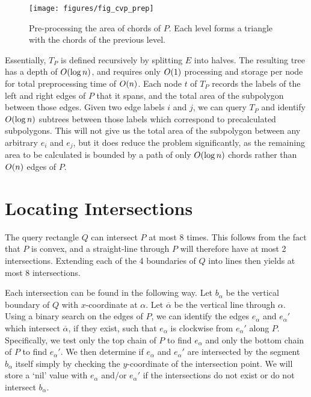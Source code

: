 \begin{figure}[t]
\begin{center}
  \texttt{[image: figures/fig\_cvp\_prep]}
  \caption[Pre-processing the area of chords of $P$.]{Pre-processing the area of chords of $P$.  Each level forms a triangle with the chords of the previous level.}
  \label{fig:convexp:preprocessing}
\end{center}
\end{figure}

Essentially, $T_P$ is defined recursively by splitting $E$ into halves. The resulting tree has a depth of $O\!\left(\log{n}\right)$, and requires only $O\!\left(1\right)$ processing and storage per node for total preprocessing time of $O\!\left(n\right)$. Each node $t$ of $T_P$ records the labels of the left and right edges of $P$ that it spans, and the total area of the subpolygon between those edges. Given two edge labels $i$ and $j$, we can query $T_P$ and identify $O\!\left(\log{n}\right)$ subtrees between those labels which correspond to precalculated subpolygons. This will not give us the total area of the subpolygon between any arbitrary $e_i$ and $e_j$, but it does reduce the problem significantly, as the remaining area to be calculated is bounded by a path of only $O\!\left(\log{n}\right)$ chords rather than $O\!\left(n\right)$ edges of $P$.


\section{Locating Intersections}
\label{:convexp:intersections}

The query rectangle $Q$ can intersect $P$ at most $8$ times. This follows from the fact that $P$ is convex, and a straight-line through $P$ will therefore have at most 2 intersections. Extending each of the 4 boundaries of $Q$ into lines then yields at most 8 intersections.

Each intersection can be found in the following way. Let $b_\alpha$ be the vertical boundary of $Q$ with $x$-coordinate at $\alpha$. Let $\overline{\alpha}$ be the vertical line through $\alpha$. Using a binary search on the edges of $P$, we can identify the edges $e_\alpha$ and $e_\alpha'$ which intersect $\overline{\alpha}$, if they exist, such that $e_\alpha$ is clockwise from $e_\alpha'$ along $P$.  Specifically, we test only the top chain of $P$ to find $e_\alpha$ and only the bottom chain of $P$ to find $e_\alpha'$. We then determine if $e_\alpha$ and $e_\alpha'$ are intersected by the segment $b_\alpha$ itself simply by checking the $y$-coordinate of the intersection point. We will store a `nil' value with $e_\alpha$ and/or $e_\alpha'$ if the intersections do not exist or do not intersect $b_\alpha$.

